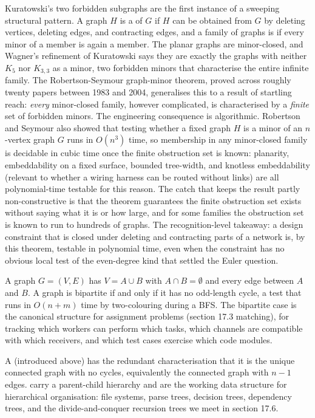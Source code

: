 \begin{mastery}
Kuratowski's two forbidden subgraphs are the first instance of a
sweeping structural pattern. A graph $H$ is a  of $G$
if $H$ can be obtained from $G$ by deleting vertices, deleting edges,
and contracting edges, and a family of graphs is 
if every minor of a member is again a member. The planar graphs are
minor-closed, and Wagner's refinement of Kuratowski says they are
exactly the graphs with neither $K_{5}$ nor $K_{3,3}$ as a minor, two
forbidden minors that characterise the entire infinite family. The
Robertson-Seymour graph-minor theorem, proved across roughly twenty
papers between 1983 and 2004, generalises this to a result of
startling reach: \emph{every} minor-closed family, however
complicated, is characterised by a \emph{finite} set of forbidden
minors. The engineering consequence is algorithmic. Robertson and
Seymour also showed that testing whether a fixed graph $H$ is a minor
of an $n$-vertex graph $G$ runs in $O(n^{3})$ time, so membership in
any minor-closed family is decidable in cubic time once the finite
obstruction set is known: planarity, embeddability on a fixed
surface, bounded tree-width, and knotless embeddability (relevant to
whether a wiring harness can be routed without links) are all
polynomial-time testable for this reason. The catch that keeps the
result partly non-constructive is that the theorem guarantees the
finite obstruction set exists without saying what it is or how large,
and for some families the obstruction set is known to run to hundreds
of graphs. The recognition-level takeaway: a design constraint that
is closed under deleting and contracting parts of a network is,
by this theorem, testable in polynomial time, even when the
constraint has no obvious local test of the even-degree kind that
settled the Euler question.
\end{mastery}

A  graph $G = (V, E)$ has $V = A \cup B$ with
$A \cap B = \emptyset$ and every edge between $A$ and $B$. A graph
is bipartite if and only if it has no odd-length cycle, a test that
runs in $O(n + m)$ time by two-colouring during a BFS. The
bipartite case is the canonical structure for assignment problems
(section 17.3 matching), for tracking which workers can perform
which tasks, which channels are compatible with which receivers,
and which test cases exercise which code modules.

A  (introduced above) has the redundant
characterisation that it is the unique connected graph with no
cycles, equivalently the connected graph with $n - 1$ edges.
 carry a parent-child hierarchy and are the
working data structure for hierarchical organisation: file systems,
parse trees, decision trees, dependency trees, and the
divide-and-conquer recursion trees we meet in section 17.6.

